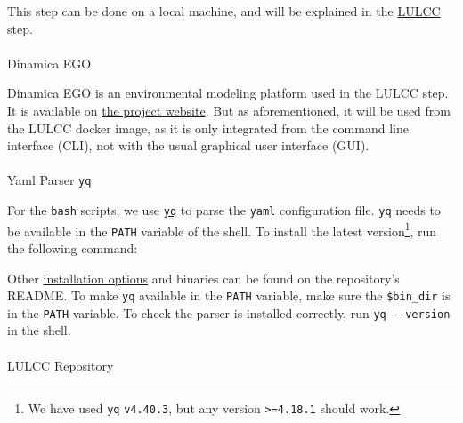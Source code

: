 \documentclass[
  letterpaper,
  DIV=11,
  numbers=noendperiod]{scrreprt}
\makeatletter
\let\oldparagraph\paragraph
\renewcommand{\paragraph}{
    \@ifstar
      \xxxParagraphStar
      \xxxParagraphNoStar
  }
\newcommand{\xxxParagraphStar}[1]{\oldparagraph*{#1}\mbox{}}
\newcommand{\xxxParagraphNoStar}[1]{\oldparagraph{#1}\mbox{}}
\newenvironment{Shaded}{\begin{snugshade}}{\end{snugshade}}
\newcommand{\AttributeTok}[1]{\textcolor[rgb]{0.40,0.45,0.13}{#1}}
\newcommand{\DataTypeTok}[1]{\textcolor[rgb]{0.68,0.00,0.00}{#1}}
\newcommand{\FunctionTok}[1]{\textcolor[rgb]{0.28,0.35,0.67}{#1}}
\newcommand{\KeywordTok}[1]{\textcolor[rgb]{0.00,0.23,0.31}{\textbf{#1}}}
\newcommand{\NormalTok}[1]{\textcolor[rgb]{0.00,0.23,0.31}{#1}}
\newcommand{\OperatorTok}[1]{\textcolor[rgb]{0.37,0.37,0.37}{#1}}
\newcommand{\VariableTok}[1]{\textcolor[rgb]{0.07,0.07,0.07}{#1}}
\makeatother
\begin{document}
This step can be done on a local machine, and will be explained in the
\href{10_LULCC.html}{LULCC} step.

\paragraph{Dinamica EGO}\label{dinamica-ego}

Dinamica EGO is an environmental modeling platform used in the LULCC
step. It is available on \href{https://dinamicaego.com/}{the project
website}. But as aforementioned, it will be used from the LULCC docker
image, as it is only integrated from the command line interface (CLI),
not with the usual graphical user interface (GUI).

\paragraph{\texorpdfstring{Yaml Parser
\texttt{yq}}{Yaml Parser yq}}\label{yaml-parser-yq}

For the \texttt{bash} scripts, we use
\href{https://mikefarah.gitbook.io/yq/}{\texttt{yq}} to parse the
\texttt{yaml} configuration file. \texttt{yq} needs to be available in
the \texttt{PATH} variable of the shell. To install the latest
version\footnote{We have used \texttt{yq} \texttt{v4.40.3}, but any
  version \texttt{\textgreater{}=4.18.1} should work.}, run the
following command:

\begin{Shaded}
\end{Shaded}

Other \href{https://github.com/mikefarah/yq/\#install}{installation
options} and binaries can be found on the repository's README. To make
\texttt{yq} available in the \texttt{PATH} variable, make sure the
\texttt{\$bin\_dir} is in the \texttt{PATH} variable. To check the
parser is installed correctly, run \texttt{yq\ -\/-version} in the
shell.

\paragraph{LULCC Repository}\label{lulcc-repository}
\end{document}
